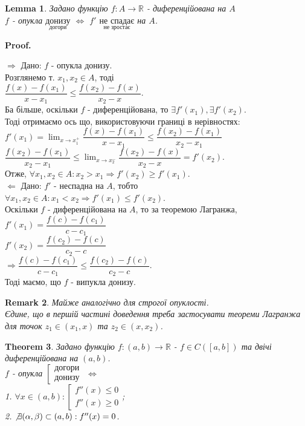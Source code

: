 \documentclass[a4paper, 14pt]{article}
\makeatletter
\def\huge{\displaystyle}
\def\qed{$\blacksquare$}
\def\rightproof{$\boxed{\Rightarrow}$ }
\def\leftproof{$\boxed{\Leftarrow}$ }
\theoremstyle{theoremdd}
\newtheorem{theorem}{Theorem}[subsection]
\theoremstyle{theoremdd}
\theoremstyle{theoremdd}
\theoremstyle{theoremdd}
\theoremstyle{theoremdd}
\theoremstyle{theoremdd}
\newtheorem{remark}[theorem]{Remark}
\theoremstyle{theoremdd}
\newtheorem{lemma}[theorem]{Lemma}
\theoremstyle{theoremdd}
\renewenvironment{proof}[1][Proof.\\]{\par
\pushQED{\hfill \qed}%
\normalfont \topsep6\p@\@plus6\p@\relax
\trivlist
\item\relax
{\bfseries
#1\@addpunct{.}}\hspace\labelsep\ignorespaces
}{%
\popQED\endtrivlist\@endpefalse
}
\makeatother
\begin{document}
\begin{lemma}
Задано функцію $f: A \to \mathbb{R}$ - диференційована на $A$\\
$f$ - опукла $\underset{\textrm{догори}}{\textrm{донизу}}$ $\iff$ $f'$ $\underset{\textrm{не зростає}}{\textrm{не спадає}}$ на $A$.
\end{lemma}

\begin{proof}
\rightproof Дано: $f$ - опукла донизу.\\
Розглянемо т. $x_1, x_2 \in A$, тоді\\
$\dfrac{f(x)-f(x_1)}{x-x_1} \leq \dfrac{f(x_2)-f(x)}{x_2-x}$.\\
Ба більше, оскільки $f$ - диференційована, то $\exists f'(x_1), \exists f'(x_2)$.\\
Тоді отримаємо ось що, використовуючи границі в нерівностях:\\
$f'(x_1) = \huge \lim_{x \to x_1^+} \dfrac{f(x)-f(x_1)}{x-x_1} \leq \dfrac{f(x_2)-f(x_1)}{x_2-x_1}$\\
$\dfrac{f(x_2)-f(x_1)}{x_2-x_1} \leq \huge \lim_{x \to x_2^-} \dfrac{f(x_2)-f(x)}{x_2-x} = f'(x_2)$.\\
Отже, $\forall x_1,x_2 \in A: x_2 > x_1 \Rightarrow f'(x_2) \geq f'(x_1)$.
\bigskip \\
\leftproof Дано: $f'$ - неспадна на $A$, тобто\\
$\forall x_1,x_2 \in A: x_1 < x_2 \Rightarrow f'(x_1) \leq f'(x_2)$.\\
Оскільки $f$ - диференційована на $A$, то за теоремою Лагранжа,\\
$f'(x_1) = \dfrac{f(c) - f(c_1)}{c- c_1}$\\
$f'(x_2) = \dfrac{f(c_2) - f(c)}{c_2 - c}$\\
$\Rightarrow \dfrac{f(c) - f(c_1)}{c- c_1} \leq \dfrac{f(c_2) - f(c)}{c_2 - c}$.\\
Тоді маємо, що $f$ - випукла донизу.
\end{proof}

\begin{remark}
Майже аналогічно для строгої опуклості.\\
Єдине, що в першій частині доведення треба застосувати теореми Лагранжа для точок $z_1 \in (x_1,x)$ та $z_2 \in (x,x_2)$.
\end{remark}

\begin{theorem}
Задано функцію $f: (a,b) \to \mathbb{R}$ - $f \in C([a,b])$ та двічі диференційована на $(a,b)$.\\
$f$ - опукла $\left[ \begin{gathered} \textrm{догори} \\ \textrm{донизу} \end{gathered} \right.$ $\iff$\\
1. $\forall x \in (a,b): \left[ \begin{gathered} f''(x) \leq 0 \\ f''(x) \geq 0 \end{gathered} \right.$;\\
2. $\not\exists (\alpha, \beta) \subset (a,b): f''(x) = 0$.
\end{theorem}
\end{document}
